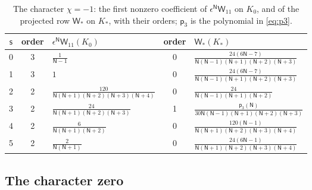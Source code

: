 \documentclass{amsart}
\theoremstyle{definition}
\theoremstyle{remark}
\numberwithin{equation}{section}
\begin{document}
\begin{table}[H]\small\renewcommand{\arraystretch}{2.1}\setlength{\tabcolsep}{4pt}
\caption{The character $\chi=-1$: the first nonzero coefficient of $\epsilon^{\mathsf N}\mathsf W_{11}$ on $K_0$, and of the projected row $\mathsf W_*$ on $K_*$, with their orders; $\mathsf p_3$ is the polynomial in \eqref{eq:p3}.}\label{tab:minusone}
\begin{tabular}{cclcl}\toprule $\mathsf s$&order&$\epsilon^{\mathsf N}\mathsf W_{11}(K_0)$&order&$\mathsf W_*(K_*)$\\\midrule
0&3&$\displaystyle \frac{1}{\mathsf N - 1}$&0&$\displaystyle \frac{24(6\mathsf N - 7)}{\mathsf N(\mathsf N - 1)(\mathsf N + 1)(\mathsf N + 2)(\mathsf N + 3)}$\\
1&3&$\displaystyle 1$&0&$\displaystyle \frac{24(6\mathsf N - 7)}{\mathsf N(\mathsf N - 1)(\mathsf N + 1)(\mathsf N + 2)(\mathsf N + 3)}$\\
2&2&$\displaystyle \frac{120}{\mathsf N(\mathsf N + 1)(\mathsf N + 2)(\mathsf N + 3)(\mathsf N + 4)}$&0&$\displaystyle \frac{24}{\mathsf N(\mathsf N - 1)(\mathsf N + 1)(\mathsf N + 2)}$\\
3&2&$\displaystyle \frac{24}{\mathsf N(\mathsf N + 1)(\mathsf N + 2)(\mathsf N + 3)}$&1&$\displaystyle \frac{\mathsf p_3(\mathsf N)}{30\mathsf N(\mathsf N - 1)(\mathsf N + 1)(\mathsf N + 2)(\mathsf N + 3)}$\\
4&2&$\displaystyle \frac{6}{\mathsf N(\mathsf N + 1)(\mathsf N + 2)}$&0&$\displaystyle \frac{120(\mathsf N - 1)}{\mathsf N(\mathsf N + 1)(\mathsf N + 2)(\mathsf N + 3)(\mathsf N + 4)}$\\
5&2&$\displaystyle \frac{2}{\mathsf N(\mathsf N + 1)}$&0&$\displaystyle \frac{24(6\mathsf N - 1)}{\mathsf N(\mathsf N + 1)(\mathsf N + 2)(\mathsf N + 3)(\mathsf N + 4)}$\\
\bottomrule\end{tabular}\end{table}

\subsection*{The character zero}
\end{document}
